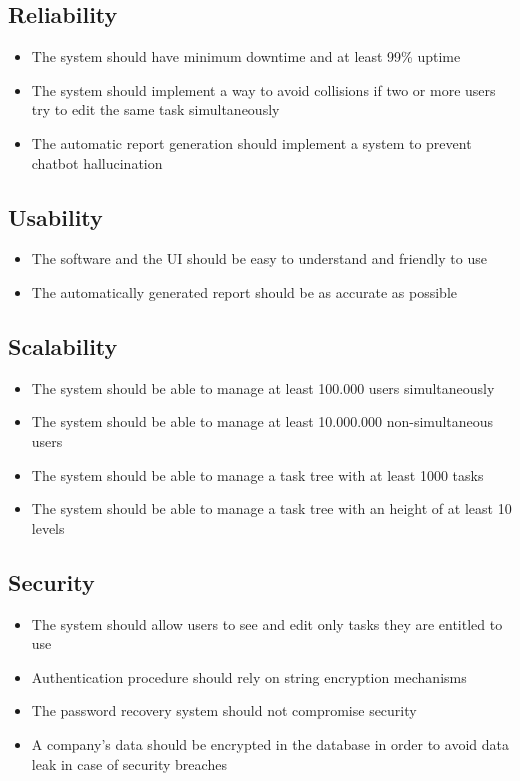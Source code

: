 \documentclass{article}
\begin{document}
\subsection{Reliability}
\begin{itemize}
    \item The system should have minimum downtime and at least 99\% uptime
    \item The system should implement a way to avoid collisions if two or more users try to edit the same task simultaneously
    \item The automatic report generation should implement a system to prevent chatbot hallucination
\end{itemize}

\subsection{Usability}
\begin{itemize}
    \item The software and the UI should be easy to understand and friendly to use
    \item The automatically generated report should be as accurate as possible
\end{itemize}

\subsection{Scalability}
\begin{itemize}
    \item The system should be able to manage at least 100.000 users simultaneously
    \item The system should be able to manage at least 10.000.000 non-simultaneous users
    \item The system should be able to manage a task tree with at least 1000 tasks
    \item The system should be able to manage a task tree with an height of at least 10 levels
\end{itemize}

\subsection{Security}
\begin{itemize}
    \item The system should allow users to see and edit only tasks they are entitled to use
    \item Authentication procedure should rely on string encryption mechanisms
    \item The password recovery system should not compromise security
    \item A company's data should be encrypted in the database in order to avoid data leak in case of security breaches
\end{itemize}
\end{document}
